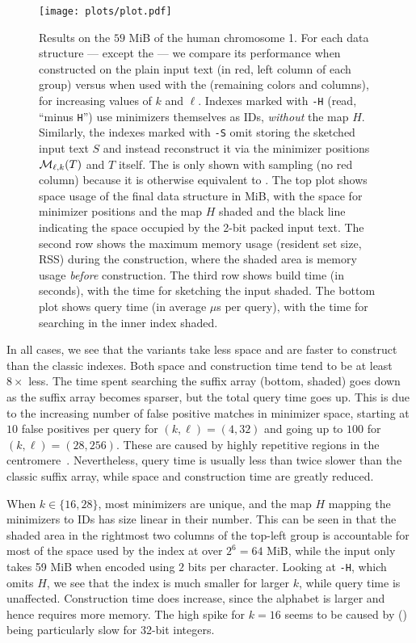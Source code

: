 \begin{figure*}[t]
\centering
\texttt{[image: plots/plot.pdf]}%
\caption{
Results on the $59$ MiB of the human chromosome 1. For each data structure --- except the {\sindex} --- we compare its performance when constructed on the plain input text (in red, left column of each group) versus when used with the {\uindex} (remaining
  colors and columns), for increasing values of $k$ and $\ell$.
  Indexes marked with \texttt{-H} (read, ``minus \texttt{H}'') use minimizers themselves as IDs, \textit{without} the map $H$.
  Similarly,
  the indexes marked with \texttt{-S} omit storing the sketched input text
  $S$ and instead reconstruct it via the minimizer positions $\mathcal{M}_{\ell,k}(T)$
  and $T$ itself.
  The {\sindex} is only shown with sampling (no red column) because it is otherwise equivalent
  to {{\sa}}.
%
  The top plot shows space usage of the final data structure in MiB, with the space for minimizer positions
  and the map $H$ shaded and the black line indicating the space occupied by the
  2-bit packed input text. The second row shows the maximum memory usage (resident set size, RSS) during the
  construction, where the shaded area is memory usage \emph{before} construction.
  The third row shows build time (in seconds), with the time for sketching the input shaded.
  The bottom plot shows query time (in average $\mu$s per {\Locate} query), with the time for searching in the
  inner index shaded.
  }
\label{fig:plot-v2}
\end{figure*}


In all cases, we see that the {\uindex} variants take less space and are faster to
construct than the classic indexes. 
Both space and
construction time tend to be at least $8\times$ less.
The time spent searching the suffix array (bottom, shaded) goes down as the
suffix array becomes sparser, but the total query time goes up.
This is due to the increasing number of false positive matches in minimizer
space, starting at $10$ false positives per query for $(k,\ell)=(4,32)$ and going
up to $100$ for $(k,\ell)=(28,256)$. These are caused by highly repetitive regions
in the centromere~\cite{grady1992highly}.
Nevertheless, query time is usually less than twice slower than the classic suffix
array, while space and construction time are greatly reduced.

When $k\in \{16,28\}$, most minimizers are unique, and the map $H$ mapping the minimizers
to IDs has size linear in their number. This can be seen in that the shaded area in
the rightmost two columns of the top-left group is accountable for most of the
space used by the index at over $2^6=64$ MiB, while the input only takes 59 MiB when encoded using $2$ bits per character.
Looking at {\sa} \texttt{-H}, which omits $H$,
we see that the index is much smaller for larger $k$, while query time is
unaffected. Construction time does increase, since the alphabet is larger and
hence requires more memory. The high spike for $k=16$ seems to be caused by
{\sa} () being particularly slow for 32-bit integers.

